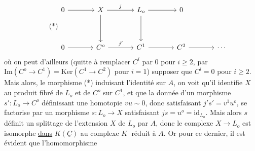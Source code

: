 \begin{equation}\tag{*}
\begin{tikzcd}[column sep=large, row sep=huge]
0 \arrow[r] & X \arrow[r, "j"] \arrow[d] & L_o \arrow[r] \arrow[d] & 0 \\
0 \arrow[r] & C^o \arrow[r, "j'"] & C^1 \arrow[r] & C^2 \arrow[r] & \cdots
\end{tikzcd}
\end{equation}
où on peut d'ailleurs (quitte à remplacer $C^i$ par $0$ pour $i \geq 2$, par $\mathrm{Im}(C^o \longrightarrow C^1) = \mathrm{Ker}(C^1 \longrightarrow C^2)$ pour $i = 1$) supposer que $C^i = 0$ pour $i \geq 2$. Mais alors, le morphisme (*) induisant l'identité sur $A$, on voit qu'il identifie $X$ au produit fibré de $L_o$ et de $C^o$ sur $C^1$, et que la donnée d'un morphisme $s' : L_o \longrightarrow C^o$ définissant une homotopie $vu \sim 0$, donc satisfaisant $j's' = v^1u^o$, se factorise par un morphisme $s : L_o \longrightarrow X$ satisfaisant $js = u^o = \mathrm{id}_{L_o}$. Mais alors $s$ définit un splittage de l'extension $X$ de $L_o$ par $A$, donc le complexe $X \longrightarrow L_o$ est isomorphe \underline{dans} $K(\underline{C})$ au complexe $K^{\cdot}$
réduit à $A$. Or pour ce dernier, il est évident que l'homomorphisme

